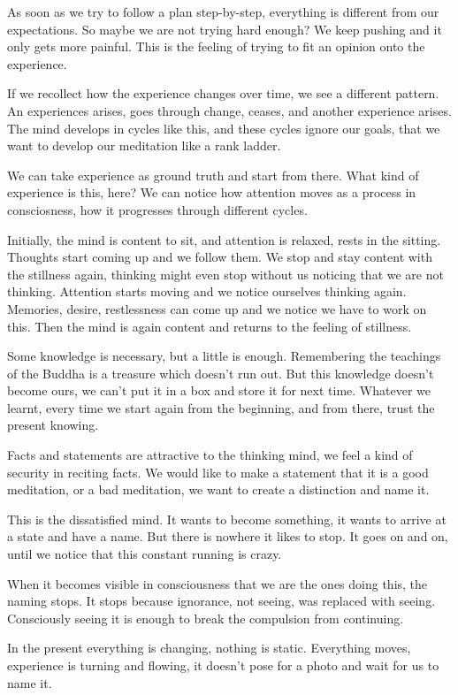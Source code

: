 As soon as we try to follow a plan step-by-step, everything is different
from our expectations. So maybe we are not trying hard enough? We keep
pushing and it only gets more painful. This is the feeling of trying to
fit an opinion onto the experience.

If we recollect how the experience changes over time, we see a different
pattern. An experiences arises, goes through change, ceases, and another
experience arises. The mind develops in cycles like this, and these
cycles ignore our goals, that we want to develop our meditation like a
rank ladder.

We can take experience as ground truth and start from there. What kind
of experience is this, here? We can notice how attention moves as a
process in consciosness, how it progresses through different cycles.

Initially, the mind is content to sit, and attention is relaxed, rests
in the sitting. Thoughts start coming up and we follow them. We stop and
stay content with the stillness again, thinking might even stop without
us noticing that we are not thinking. Attention starts moving and we
notice ourselves thinking again. Memories, desire, restlessness can come
up and we notice we have to work on this. Then the mind is again content
and returns to the feeling of stillness.

Some knowledge is necessary, but a little is enough. Remembering the
teachings of the Buddha is a treasure which doesn't run out. But this
knowledge doesn't become ours, we can't put it in a box and store it for
next time. Whatever we learnt, every time we start again from the
beginning, and from there, trust the present knowing.

Facts and statements are attractive to the thinking mind, we feel a kind
of security in reciting facts. We would like to make a statement that it
is a good meditation, or a bad meditation, we want to create a
distinction and name it.

This is the dissatisfied mind. It wants to become something, it wants to
arrive at a state and have a name. But there is nowhere it likes to
stop. It goes on and on, until we notice that this constant running is
crazy.

When it becomes visible in consciousness that we are the ones doing
this, the naming stops. It stops because ignorance, not seeing, was
replaced with seeing. Consciously seeing it is enough to break the
compulsion from continuing.

In the present everything is changing, nothing is static. Everything
moves, experience is turning and flowing, it doesn't pose for a photo
and wait for us to name it.

